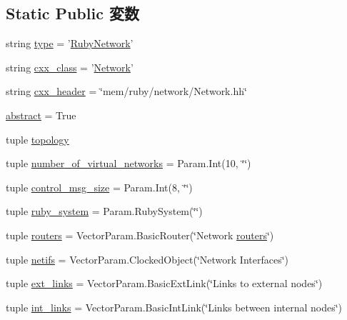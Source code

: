 \subsection*{Static Public 変数}
\begin{DoxyCompactItemize}
\item 
string \hyperlink{classNetwork_1_1RubyNetwork_acce15679d830831b0bbe8ebc2a60b2ca}{type} = '\hyperlink{classNetwork_1_1RubyNetwork}{RubyNetwork}'
\item 
string \hyperlink{classNetwork_1_1RubyNetwork_a58cd55cd4023648e138237cfc0822ae3}{cxx\_\-class} = '\hyperlink{classNetwork}{Network}'
\item 
string \hyperlink{classNetwork_1_1RubyNetwork_a17da7064bc5c518791f0c891eff05fda}{cxx\_\-header} = \char`\"{}mem/ruby/network/Network.hh\char`\"{}
\item 
\hyperlink{classNetwork_1_1RubyNetwork_a17fa61ac3806b481cafee5593b55e5d0}{abstract} = True
\item 
tuple \hyperlink{classNetwork_1_1RubyNetwork_a91275356bdab99969e72790d577ce8df}{topology}
\item 
tuple \hyperlink{classNetwork_1_1RubyNetwork_a3a95fb4eb2b16f40b89c010572e72a54}{number\_\-of\_\-virtual\_\-networks} = Param.Int(10, \char`\"{}\char`\"{})
\item 
tuple \hyperlink{classNetwork_1_1RubyNetwork_a0c4df9bd1e470f6da39cbf1972b595d7}{control\_\-msg\_\-size} = Param.Int(8, \char`\"{}\char`\"{})
\item 
tuple \hyperlink{classNetwork_1_1RubyNetwork_ad43d9de73a55aa43ab5023d7815d7286}{ruby\_\-system} = Param.RubySystem(\char`\"{}\char`\"{})
\item 
tuple \hyperlink{classNetwork_1_1RubyNetwork_a97871b4dad4b2cfd7631d3b6186c76e4}{routers} = VectorParam.BasicRouter(\char`\"{}Network \hyperlink{classNetwork_1_1RubyNetwork_a97871b4dad4b2cfd7631d3b6186c76e4}{routers}\char`\"{})
\item 
tuple \hyperlink{classNetwork_1_1RubyNetwork_a6affed49d5dbca8d315c82b3a02c588e}{netifs} = VectorParam.ClockedObject(\char`\"{}Network Interfaces\char`\"{})
\item 
tuple \hyperlink{classNetwork_1_1RubyNetwork_ac0d3207c2e6c5b337f986a3eea2fad55}{ext\_\-links} = VectorParam.BasicExtLink(\char`\"{}Links to external nodes\char`\"{})
\item 
tuple \hyperlink{classNetwork_1_1RubyNetwork_a382a7133bdc70d16f01d876f743a7d2d}{int\_\-links} = VectorParam.BasicIntLink(\char`\"{}Links between internal nodes\char`\"{})
\end{DoxyCompactItemize}


